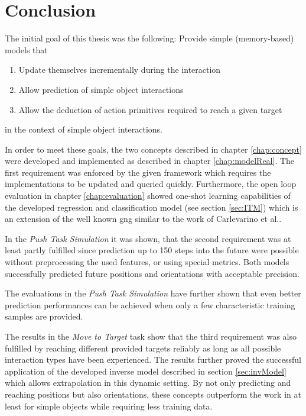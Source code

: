\chapter{Conclusion \label{chap:conclusion}}


The initial goal of this thesis was the following:
Provide simple (memory-based) models that
\begin{enumerate}
\item Update themselves incrementally during the interaction
\item Allow prediction of simple object interactions
\item Allow the deduction of action primitives required to reach a given target
\end{enumerate}
in the context of simple object interactions.

In order to meet these goals, the two concepts described in chapter \ref{chap:concept} were developed and implemented as described in chapter \ref{chap:modelReal}. 
The first requirement was enforced by the given framework which requires the implementations to be updated and queried quickly. Furthermore, the open loop evaluation in chapter \ref{chap:evaluation} showed one-shot learning capabilities of the developed regression and classification model (see section \ref{sec:ITM}) which is an extension of the well known \gls{gng} similar to the work of Carlevarino et al.\cite{carlevarino2000incremental}.

In the \textit{Push Task Simulation} it was shown, that the second requirement was at least partly fulfilled since prediction up to 150 steps into the future were possible without preprocessing the used features, or using special metrics. Both models successfully predicted future positions and orientations with acceptable precision.

The evaluations in the \textit{Push Task Simulation} have further shown that even better prediction performances can be achieved when only a few characteristic training samples are provided.

The results in the \textit{Move to Target} task show that the third requirement was also fulfilled by reaching different provided targets reliably as long as all possible interaction types have been experienced. The results further proved the successful application of the developed inverse model described in section \ref{sec:invModel} which allows extrapolation in this dynamic setting.
By not only predicting and reaching positions but also orientations, these concepts outperform the work in \cite{pushing} at least for simple objects while requiring less training data. 

